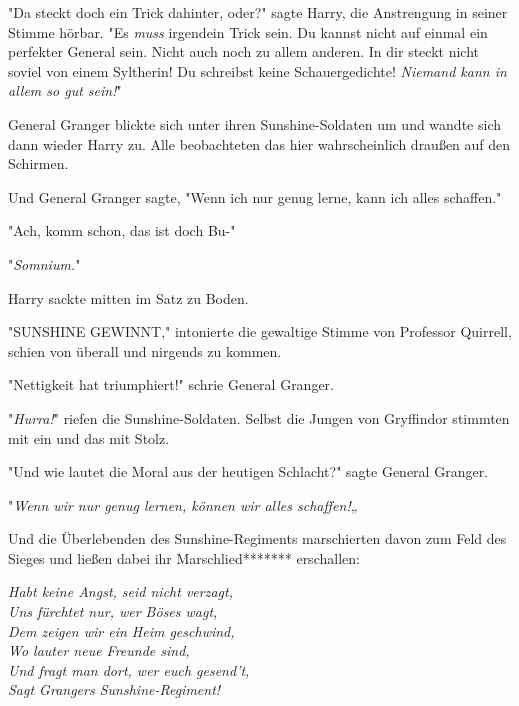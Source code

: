 {"Da steckt doch ein Trick dahinter, oder?" sagte Harry, die Anstrengung in seiner Stimme hörbar. "Es \emph{muss} irgendein Trick sein. Du kannst nicht auf einmal ein perfekter General sein. Nicht auch noch zu allem anderen. In dir steckt nicht soviel von einem Syltherin! Du schreibst keine Schauergedichte! \emph{Niemand kann in allem so gut sein!}"

General Granger blickte sich unter ihren Sunshine-Soldaten um und wandte sich dann wieder Harry zu. Alle beobachteten das hier wahrscheinlich draußen auf den Schirmen.

Und General Granger sagte, "Wenn ich nur genug lerne, kann ich alles schaffen."

"Ach, komm schon, das ist doch Bu-"

"\emph{Somnium.}"

Harry sackte mitten im Satz zu Boden.

"SUNSHINE GEWINNT," intonierte die gewaltige Stimme von Professor Quirrell, schien von überall und nirgends zu kommen.

"Nettigkeit hat triumphiert!" schrie General Granger.

"\emph{Hurra!}" riefen die Sunshine-Soldaten. Selbst die Jungen von Gryffindor stimmten mit ein und das mit Stolz.

"Und wie lautet die Moral aus der heutigen Schlacht?" sagte General Granger.

"\emph{Wenn wir nur genug lernen, können wir alles schaffen!}„

Und die Überlebenden des Sunshine-Regiments marschierten davon zum Feld des Sieges und ließen dabei ihr Marschlied******* erschallen:

\emph{Habt keine Angst, seid nicht verzagt,\\ Uns fürchtet nur, wer Böses wagt,\\ Dem zeigen wir ein Heim geschwind,\\ Wo lauter neue Freunde sind,\\ Und fragt man dort, wer euch gesend't,\\ Sagt Grangers Sunshine-Regiment!}

}
